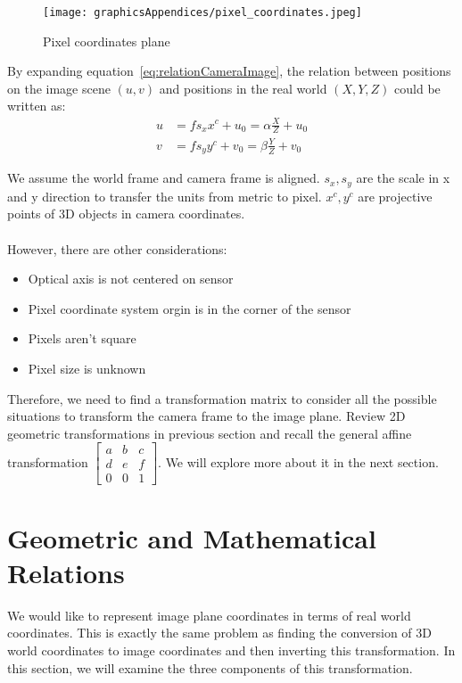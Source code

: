 \begin{figure}[H]
\centering
\texttt{[image: graphicsAppendices/pixel\_coordinates.jpeg]}
\caption{Pixel coordinates plane}
\label{fig:pixelCoordinate}
\end{figure}

By expanding equation~\ref{eq:relationCameraImage}, the relation between positions on the image scene $(u, v)$ and positions in the real world $(X, Y, Z)$ could be written as:
\begin{align*}
 u &= f s_x x^c+u_0 = \alpha \frac{X}{Z} + u_0 \\
 v &= f s_y y^c+v_0 = \beta  \frac{Y}{Z} + v_0
 \end{align*}

We assume the world frame and camera frame is aligned. $s_x, s_y$ are the scale in x and y direction to transfer the units from metric to pixel. $x^c, y^c$ are projective points of 3D objects in camera coordinates. \\
\\
However, there are other considerations:
\begin{itemize}
    \item Optical axis is not centered on sensor
    \item Pixel coordinate system orgin is in the corner of the sensor
    \item Pixels aren't square
    \item Pixel size is unknown
\end{itemize}

Therefore, we need to find a transformation matrix to consider all the possible situations to transform the camera frame to the image plane. Review 2D geometric transformations in previous section and recall the general affine transformation $\left[\begin{array}{ccc} a & b & c \\ d & e & f \\ 0 & 0 & 1 \end{array}\right]$. We will explore more about it in the next section.

\section{Geometric and Mathematical Relations}
We would like to represent image plane coordinates in terms of real world coordinates. This is exactly the same problem as finding the conversion of 3D world coordinates to image coordinates and then inverting this transformation. In this section, we will examine the three components of this transformation. 

